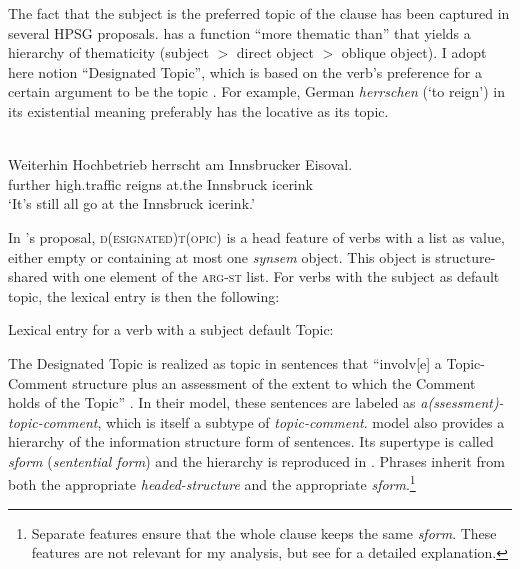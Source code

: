 The fact that the subject is the preferred topic of the clause has been captured in several HPSG proposals. \citet{Webelhuth.2007} has a function ``more thematic than'' that yields a hierarchy of thematicity (subject $>$ direct object $>$ oblique object). I adopt here  notion ``Designated Topic'', which is based on the verb's preference for a certain argument to be the topic \citep*[see also][Section~5.3.3.2]{Mueller.S.2020?.chapter5}. For example, German \emph{herrschen} (`to reign') in its existential meaning preferably has the locative as its topic. 

\ea \citep[72]{Bildhauer.2010}\nopagebreak\\
\gll Weiterhin Hochbetrieb herrscht am Innsbrucker Eisoval.\\
further high.traffic reigns at.the Innsbruck icerink\\
\glt `It's still all go at the Innsbruck icerink.'
\z 

In \citeauthor{Bildhauer.2010}'s proposal, \textsc{d(esignated)t(opic)} is a head feature of verbs with a list as value, either empty or containing at most one \emph{synsem} object. This object is structure-shared with one element of the \textsc{arg-st} list. For verbs with the subject as default topic, the lexical entry is then the following:\largerpage

\ea Lexical entry for a verb with a subject default Topic: \nopagebreak

\z 

The Designated Topic is realized as topic in sentences that ``involv[e] a Topic-Comment structure plus an assessment of the extent to which the Comment holds of the Topic'' \citep[73]{Bildhauer.2010}. In their model, these sentences are labeled as \emph{a(ssessment)-topic-comment}, which is itself a subtype of \emph{topic-comment}.  model also provides a hierarchy of the information structure form of sentences. Its supertype is called \emph{sform} (\emph{sentential form}) and the hierarchy is reproduced in . Phrases inherit from both the appropriate \emph{headed-structure} and the appropriate \emph{sform}.{\footnote{Separate features ensure that the whole clause keeps the same \emph{sform}. These features are not relevant for my analysis, but see \citet[Chapter~7]{Song.2017} for a detailed explanation.}}


